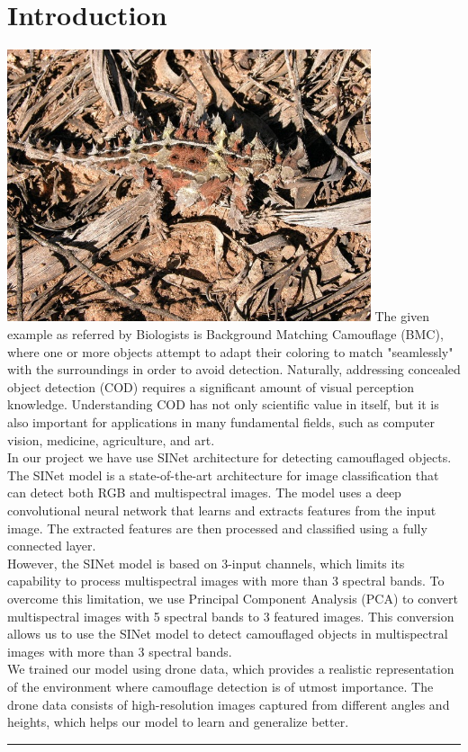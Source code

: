 \section{{{\fontsize{17}{21}\selectfont \textbf{Introduction}}}}
\setlength{\columnsep}{1.5cm}
\begin{multicols}{2}
\includegraphics[width=\columnwidth,height=8cm]{sections/LBP/418993_0_En_698-1_Fig1_HTML.jpg}
\vspace{0.5cm}
 The given example as referred by Biologists is Background Matching Camouflage (BMC), where one or more objects attempt to adapt their coloring to match "seamlessly" with the surroundings in order to avoid detection. Naturally, addressing concealed object detection (COD) requires a significant amount of visual perception knowledge. Understanding COD has not only scientific value in itself, but it is also important for applications in many fundamental fields, such as computer vision, medicine, agriculture, and art.\\
 In our project we have use SINet architecture for detecting camouflaged objects. The SINet model is a state-of-the-art architecture for image classification that can detect both RGB\cite{OBJ_DET} and multispectral images. The model uses a deep convolutional neural network that learns and extracts features from the input image. The extracted features are then processed and classified using a fully connected layer.\\
 However, the SINet model is based on 3-input channels, which limits its capability to process multispectral images with more than 3 spectral bands. To overcome this limitation, we use Principal Component Analysis (PCA) to convert multispectral images with 5 spectral bands to 3 featured images. This conversion allows us to use the SINet model to detect camouflaged objects in multispectral images with more than 3 spectral bands.\\
 We trained our model using drone data, which provides a realistic representation of the environment where camouflage detection is of utmost importance. The drone data consists of high-resolution images captured from different angles and heights, which helps our model to learn and generalize better.\\
\end{multicols}

\vspace{0.5cm}
{\color{gray}\hrule}
\vspace{0.5cm}